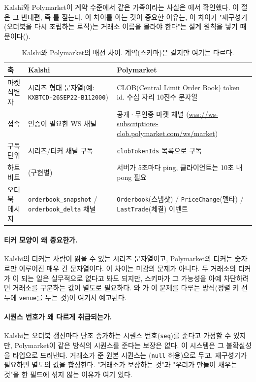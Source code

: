 Kalshi와 Polymarket이 계약 수준에서 같은 가족이라는 사실은
에서 확인했다. 이 절은 그 반대편, 즉 를 짚는다. 이 차이를 아는 것이 중요한
이유는, 이 차이가 "재구성기(오더북을 다시 조립하는 로직)는 거래소 이름을 몰라야
한다"는 설계 원칙을 낳기 때문이다().

\begin{table}[htbp]
  \centering
  \small
  \begin{tabularx}{\linewidth}{@{}lXX@{}}
    \toprule
    축 & Kalshi & Polymarket \\
    \midrule
    마켓 식별자 & 시리즈 형태 문자열(예: \texttt{KXBTCD-26SEP22-B112000}) &
      CLOB(Central Limit Order Book) token id. 수십 자리 10진수 문자열 \\
    접속 & 인증이 필요한 WS 채널 & 공개·무인증 마켓 채널
      (\url{wss://ws-subscriptions-clob.polymarket.com/ws/market}) \\
    구독 단위 & 시리즈/티커 채널 구독 & \texttt{clobTokenIds} 목록으로 구독 \\
    하트비트 & (구현별) & 서버가 5초마다 ping, 클라이언트는 10초 내 pong 필요 \\
    오더북 메시지 & \texttt{orderbook\_snapshot} / \texttt{orderbook\_delta} 채널 &
      \texttt{Orderbook}(스냅샷) / \texttt{PriceChange}(델타) / \texttt{LastTrade}(체결) 이벤트 \\
    \bottomrule
  \end{tabularx}
  \caption{Kalshi와 Polymarket의 배선 차이. 계약(스키마)은 같지만 여기는 다르다.}
  \label{tab:problem-venue-wiring}
\end{table}

\paragraph{티커 모양이 왜 중요한가.} Kalshi의 티커는 사람이 읽을 수 있는 시리즈 문자열이고,
Polymarket의 티커는 숫자로만 이루어진 매우 긴 문자열이다. 이 차이는 미감의 문제가
아니다. 두 거래소의 티커가 이 되는 일은 실무적으로 없다고
봐도 되지만, 스키마가 그 가능성을 아예 차단하려면 거래소를 구분하는 값이 별도로
필요하다. 와 가 이 문제를 다루는 방식(정렬 키
선두에 \texttt{venue}를 두는 것)이 여기서 예고된다.

\paragraph{시퀀스 번호가 왜 다르게 취급되는가.} Kalshi는 오더북 갱신마다 단조 증가하는
시퀀스 번호(\texttt{seq})를 준다고 가정할 수 있지만, Polymarket이 같은 방식의 시퀀스를
준다는 보장은 없다. 이 시스템은 그 불확실성을 타입으로 드러낸다. 거래소가 준 원본
시퀀스는 (\texttt{null} 허용)으로 두고, 재구성기가 필요하면
별도의 값을 합성한다. "거래소가 보장하는 것"과 "우리가 만들어 채우는 것"을 한 필드에
섞지 않는 이유가 여기 있다.

